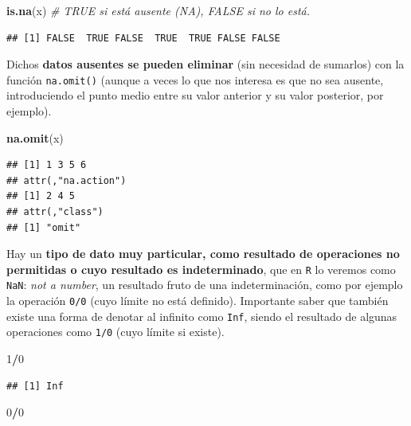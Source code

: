 \documentclass[11pt,]{book}
\newenvironment{Shaded}{\begin{snugshade}}{\end{snugshade}}
\newcommand{\CommentTok}[1]{\textcolor[rgb]{0.37,0.37,0.37}{\textit{#1}}}
\newcommand{\DecValTok}[1]{\textcolor[rgb]{0.06,0.06,0.06}{#1}}
\newcommand{\KeywordTok}[1]{\textcolor[rgb]{0.27,0.27,0.27}{\textbf{#1}}}
\newcommand{\NormalTok}[1]{#1}
\newcommand{\OperatorTok}[1]{\textcolor[rgb]{0.43,0.43,0.43}{\textbf{#1}}}
\begin{document}
\begin{Shaded}
\begin{Highlighting}[]
\KeywordTok{is.na}\NormalTok{(x) }\CommentTok{# TRUE si está ausente (NA), FALSE si no lo está.}
\end{Highlighting}
\end{Shaded}

\begin{verbatim}
## [1] FALSE  TRUE FALSE  TRUE  TRUE FALSE FALSE
\end{verbatim}

Dichos \textbf{datos ausentes se pueden eliminar} (sin necesidad de sumarlos) con la función \texttt{na.omit()} (aunque a veces lo que nos interesa es que no sea ausente, introduciendo el punto medio entre su valor anterior y su valor posterior, por ejemplo).

\begin{Shaded}
\begin{Highlighting}[]
\KeywordTok{na.omit}\NormalTok{(x)}
\end{Highlighting}
\end{Shaded}

\begin{verbatim}
## [1] 1 3 5 6
## attr(,"na.action")
## [1] 2 4 5
## attr(,"class")
## [1] "omit"
\end{verbatim}

Hay un \textbf{tipo de dato muy particular, como resultado de operaciones no permitidas o cuyo resultado es indeterminado}, que en \texttt{R} lo veremos como \texttt{NaN}: \emph{not a number}, un resultado fruto de una indeterminación, como por ejemplo la operación \texttt{0/0} (cuyo límite no está definido). Importante saber que también existe una forma de denotar al infinito como \texttt{Inf}, siendo el resultado de algunas operaciones como \texttt{1/0} (cuyo límite si existe).

\begin{Shaded}
\begin{Highlighting}[]
\DecValTok{1}\OperatorTok{/}\DecValTok{0}
\end{Highlighting}
\end{Shaded}

\begin{verbatim}
## [1] Inf
\end{verbatim}

\begin{Shaded}
\begin{Highlighting}[]
\DecValTok{0}\OperatorTok{/}\DecValTok{0}
\end{Highlighting}
\end{Shaded}
\end{document}
